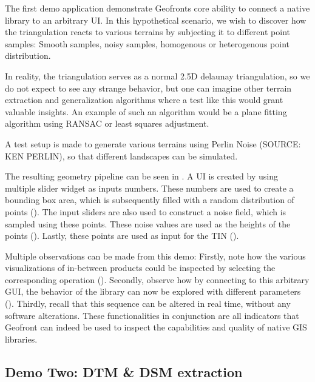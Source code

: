 The first demo application demonstrate Geofronts core ability to connect a native library to an arbitrary UI. 
In this hypothetical scenario, we wish to discover how the  triangulation reacts to various terrains by subjecting it to different point samples: Smooth samples, noisy samples, homogenous or heterogenous point distribution.

In reality, the  triangulation serves as a normal 2.5D delaunay triangulation, so we do not expect to see any strange behavior, but one can imagine other terrain extraction and generalization algorithms where a test like this would grant valuable insights.  
An example of such an algorithm would be a plane fitting algorithm using RANSAC or least squares adjustment.

A test setup is made to generate various terrains using Perlin Noise (SOURCE: KEN PERLIN), so that different landscapes can be simulated.

The resulting geometry pipeline can be seen in . 
A UI is created by using multiple slider widget as inputs numbers.
These numbers are used to create a bounding box area, which is subsequently filled with a random distribution of points ().
The input sliders are also used to construct a noise field, which is sampled using these points. These noise values are used as the heights of the points ().
Lastly, these points are used as input for the \ac{TIN} ().

Multiple observations can be made from this demo:
Firstly, note how the various visualizations of in-between products could be inspected by selecting the corresponding operation (). 
Secondly, observe how by connecting  to this arbitrary \ac{GUI}, the behavior of the library can now be explored with different parameters ().
Thirdly, recall that this sequence can be altered in real time, without any software alterations. 
These functionalities in conjunction are all indicators that Geofront can indeed be used to inspect the capabilities and quality of native \ac{GIS} libraries.

\subsection{Demo Two: DTM \& DSM extraction}

